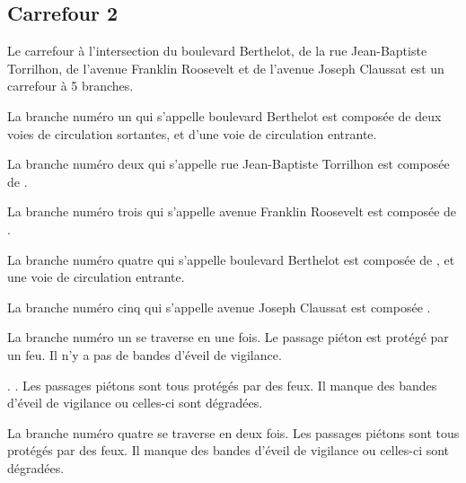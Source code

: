 \begin{appendix}
\subsection*{Carrefour 2}

\label{annexe:q_ID39_carrefour2}

Le carrefour à l'intersection du boulevard Berthelot, de la rue Jean-Baptiste Torrilhon, de l'avenue Franklin Roosevelt et de l'avenue Joseph Claussat est un carrefour à 5 branches.

\newpar{}

La branche numéro un qui s'appelle boulevard Berthelot est composée de deux voies de circulation sortantes, et d'une voie de circulation entrante.

\newpar{}

La branche numéro deux qui s'appelle rue Jean-Baptiste Torrilhon est composée de .

\newpar{}

La branche numéro trois qui s'appelle avenue Franklin Roosevelt est composée de .

\newpar{}

La branche numéro quatre qui s'appelle boulevard Berthelot est composée de , et une voie de circulation entrante.

\newpar{}

La branche numéro cinq qui s'appelle avenue Joseph Claussat est composée .

\newpar{}

La branche numéro un se traverse en une fois. Le passage piéton est protégé par un feu. Il n'y a pas de bandes d'éveil de vigilance.

\newpar{}

. . Les passages piétons sont tous protégés par des feux. Il manque des bandes d'éveil de vigilance ou celles-ci sont dégradées.

\newpar{}

La branche numéro quatre se traverse en deux fois. Les passages piétons sont tous protégés par des feux. Il manque des bandes d'éveil de vigilance ou celles-ci sont dégradées.


\end{appendix}
